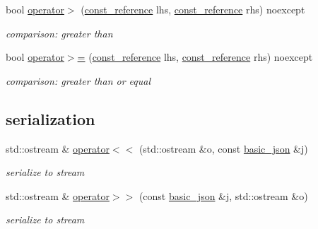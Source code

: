 \begin{DoxyCompactItemize}
bool \mbox{\hyperlink{classnlohmann_1_1basic__json_a87db51b6b936fb2ea293cdbc8702dcb8}{operator$>$}} (\mbox{\hyperlink{classnlohmann_1_1basic__json_a4057c5425f4faacfe39a8046871786ca}{const\+\_\+reference}} lhs, \mbox{\hyperlink{classnlohmann_1_1basic__json_a4057c5425f4faacfe39a8046871786ca}{const\+\_\+reference}} rhs) noexcept
\begin{DoxyCompactList}\small\item\em comparison\+: greater than \end{DoxyCompactList}\item 
bool \mbox{\hyperlink{classnlohmann_1_1basic__json_a74a943800c7f103d0990d7eef82c6453}{operator$>$=}} (\mbox{\hyperlink{classnlohmann_1_1basic__json_a4057c5425f4faacfe39a8046871786ca}{const\+\_\+reference}} lhs, \mbox{\hyperlink{classnlohmann_1_1basic__json_a4057c5425f4faacfe39a8046871786ca}{const\+\_\+reference}} rhs) noexcept
\begin{DoxyCompactList}\small\item\em comparison\+: greater than or equal \end{DoxyCompactList}\end{DoxyCompactItemize}
\subsection*{serialization}
\begin{DoxyCompactItemize}
\item 
std\+::ostream \& \mbox{\hyperlink{classnlohmann_1_1basic__json_a5e34c5435e557d0bf666bd7311211405}{operator$<$$<$}} (std\+::ostream \&o, const \mbox{\hyperlink{classnlohmann_1_1basic__json}{basic\+\_\+json}} \&j)
\begin{DoxyCompactList}\small\item\em serialize to stream \end{DoxyCompactList}\item 
std\+::ostream \& \mbox{\hyperlink{classnlohmann_1_1basic__json_a34d6a60dd99e9f33b8273a1c8db5669b}{operator$>$$>$}} (const \mbox{\hyperlink{classnlohmann_1_1basic__json}{basic\+\_\+json}} \&j, std\+::ostream \&o)
\begin{DoxyCompactList}\small\item\em serialize to stream \end{DoxyCompactList}\end{DoxyCompactItemize}
